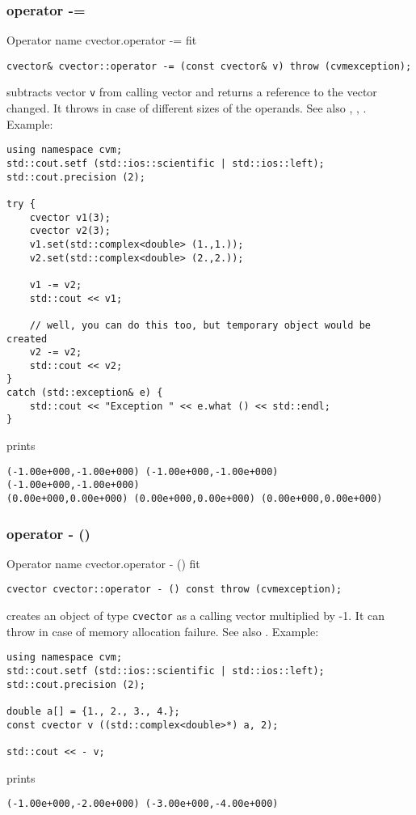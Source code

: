 \subsubsection{operator -=}
Operator%
\pdfdest name {cvector.operator -=} fit
\begin{verbatim}
cvector& cvector::operator -= (const cvector& v) throw (cvmexception);
\end{verbatim}
subtracts vector \verb"v" from  calling vector  
and returns a reference to
the vector changed.
It throws  
in case of different sizes of the operands.
See also 
,
,
.
Example:
\begin{Verbatim}
using namespace cvm;
std::cout.setf (std::ios::scientific | std::ios::left);
std::cout.precision (2);

try {
    cvector v1(3);
    cvector v2(3);
    v1.set(std::complex<double> (1.,1.));
    v2.set(std::complex<double> (2.,2.));

    v1 -= v2;
    std::cout << v1;

    // well, you can do this too, but temporary object would be created
    v2 -= v2;
    std::cout << v2;
}
catch (std::exception& e) {
    std::cout << "Exception " << e.what () << std::endl;
}
\end{Verbatim}
prints
\begin{Verbatim}
(-1.00e+000,-1.00e+000) (-1.00e+000,-1.00e+000) (-1.00e+000,-1.00e+000)
(0.00e+000,0.00e+000) (0.00e+000,0.00e+000) (0.00e+000,0.00e+000)
\end{Verbatim}
\newpage



\subsubsection{operator - ()}
Operator%
\pdfdest name {cvector.operator - ()} fit
\begin{verbatim}
cvector cvector::operator - () const throw (cvmexception);
\end{verbatim}
creates an object of type \verb"cvector" as
a calling  vector multiplied by -1.
It can throw 
in case of memory allocation failure.
See also .
Example:
\begin{Verbatim}
using namespace cvm;
std::cout.setf (std::ios::scientific | std::ios::left);
std::cout.precision (2);

double a[] = {1., 2., 3., 4.};
const cvector v ((std::complex<double>*) a, 2);

std::cout << - v;
\end{Verbatim}
prints
\begin{Verbatim}
(-1.00e+000,-2.00e+000) (-3.00e+000,-4.00e+000)
\end{Verbatim}
\newpage




